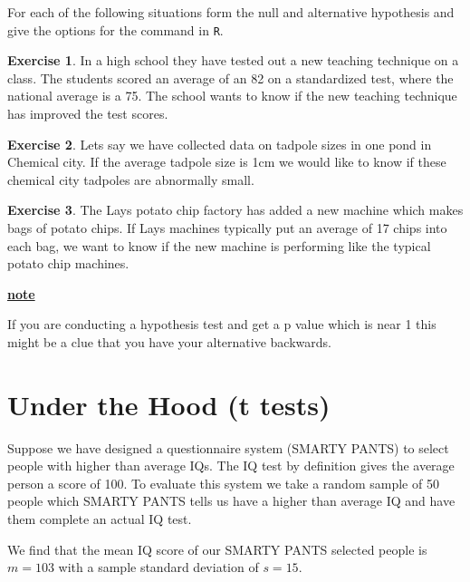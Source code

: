 \documentclass[
]{book}
\newenvironment{rmdblock}[1]
  {\begin{shaded*}
  \centerline{\underline{\textbf{#1}}}

  }
  {
  \end{shaded*}
  }
\newenvironment{note}
  {\begin{rmdblock}{note}}
  {\end{rmdblock}}
\theoremstyle{definition}
\theoremstyle{definition}
\theoremstyle{definition}
\newtheorem{exercise}{Exercise}[chapter]
\theoremstyle{definition}
\theoremstyle{remark}
\begin{document}
For each of the following situations form the null and alternative hypothesis and give the options for the command in \texttt{R}.

\begin{exercise}
\protect\hypertarget{exr:unnamed-chunk-512}{}\label{exr:unnamed-chunk-512}In a high school they have tested out a new teaching technique on a class. The students scored an average of an 82 on a standardized test, where the national average is a 75. The school wants to know if the new teaching technique has improved the test scores.
\end{exercise}

\begin{exercise}
\protect\hypertarget{exr:unnamed-chunk-513}{}\label{exr:unnamed-chunk-513}Lets say we have collected data on tadpole sizes in one pond in Chemical city. If the average tadpole size is 1cm we would like to know if these chemical city tadpoles are abnormally small.
\end{exercise}

\begin{exercise}
\protect\hypertarget{exr:unnamed-chunk-514}{}\label{exr:unnamed-chunk-514}The Lays potato chip factory has added a new machine which makes bags of potato chips. If Lays machines typically put an average of 17 chips into each bag, we want to know if the new machine is performing like the typical potato chip machines.
\end{exercise}

\begin{note}
If you are conducting a hypothesis test and get a p value which is near 1 this might be a clue that you have your alternative backwards.
\end{note}

\hypertarget{under-the-hood-t-tests}{%
\section{Under the Hood (t tests)}\label{under-the-hood-t-tests}}

Suppose we have designed a questionnaire system (SMARTY PANTS) to select people with higher than average IQs. The IQ test by definition gives the average person a score of 100. To evaluate this system we take a random sample of 50 people which SMARTY PANTS tells us have a higher than average IQ and have them complete an actual IQ test.

We find that the mean IQ score of our SMARTY PANTS selected people is \(m=103\) with a sample standard deviation of \(s=15\).
\end{document}
